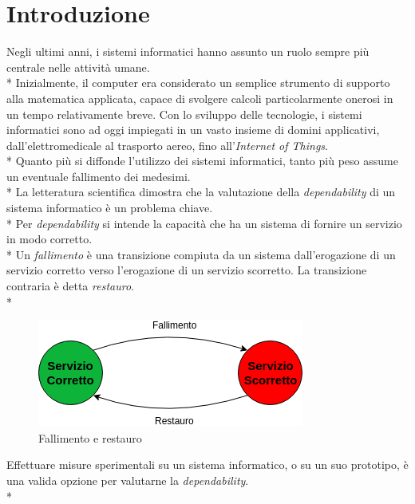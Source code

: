 \chapter{Introduzione}
Negli ultimi anni, i sistemi informatici hanno assunto un ruolo sempre pi\`u centrale nelle attivit\`a umane.\\*
Inizialmente, il computer era considerato un semplice strumento di supporto alla matematica applicata, capace di svolgere calcoli particolarmente onerosi in un tempo relativamente breve. Con lo sviluppo delle tecnologie, i sistemi informatici sono ad oggi impiegati in un vasto insieme di domini applicativi, dall'elettromedicale al trasporto aereo, fino all'\emph{Internet of Things}.\\*
Quanto pi\`u si diffonde l'utilizzo dei sistemi informatici, tanto pi\`u peso assume un eventuale fallimento dei medesimi.\\*
La letteratura scientifica dimostra che la valutazione della \emph{dependability} di un sistema informatico \`e un problema chiave.\\*
Per \emph{dependability} si intende la capacit\`a che ha un sistema di fornire un servizio in modo corretto. \cite{depdef}\\*
Un \emph{fallimento} \`e una transizione compiuta da un sistema dall'erogazione di un servizio corretto verso l'erogazione di un servizio scorretto. La transizione contraria \`e detta \emph{restauro}.\\*
\begin{figure}[h]
	\centering
	\includegraphics[width=0.7\linewidth]{img/FallimentoRestauro}
	\caption{Fallimento e restauro}
	\label{fig:fallimentorestauro}
\end{figure}\newpage
Effettuare misure sperimentali su un sistema informatico, o su un suo prototipo, \`e una valida opzione per valutarne la \emph{dependability}.\\*
